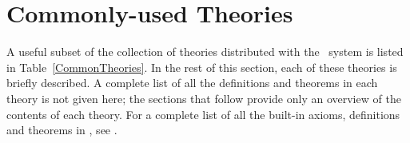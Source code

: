 \chapter{Commonly-used Theories}\label{HOLtheories}

A useful subset of the collection of theories distributed with the
\HOL\ system  is listed in Table~\ref{CommonTheories}.  In
the rest of this section, each of these theories is briefly described.
A complete list of all the definitions and theorems in each theory is
not given here; the sections that follow provide only an overview of
the contents of each theory.  For a complete list of all the built-in
axioms, definitions and theorems in \HOL, see \REFERENCE.



